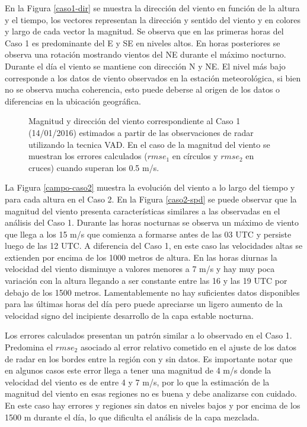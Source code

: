 \documentclass[12pt,spanish,oneside, a4paper]{book}
\begin{document}
En la Figura \ref{caso1-dir} se muestra la dirección del viento en
función de la altura y el tiempo, los vectores representan la dirección
y sentido del viento y en colores y largo de cada vector la magnitud. Se
observa que en las primeras horas del Caso 1 es predominante del E y SE
en niveles altos. En horas posteriores se observa una rotación mostrando
vientos del NE durante el máximo nocturno. Durante el día el viento se
mantiene con dirección N y NE. El nivel más bajo corresponde a los datos
de viento observados en la estación meteorológica, si bien no se observa
mucha coherencia, esto puede deberse al origen de los datos o
diferencias en la ubicación geográfica.

\begin{figure}
\newline{}\caption{Magnitud y dirección del viento  correspondiente al Caso 1 (14/01/2016) estimados a partir de las observaciones de radar utilizando la tecnica VAD. En el caso de la magnitud del viento se muestran los errores calculados ($rmse_1$ en círculos y $rmse_2$ en cruces) cuando superan los 0.5 m/s. \label{campo-caso1}}\label{fig:campo-caso1}
\end{figure}

La Figura \ref{campo-caso2} muestra la evolución del viento a lo largo
del tiempo y para cada altura en el Caso 2. En la Figura \ref{caso2-spd}
se puede observar que la magnitud del viento presenta características
similares a las observadas en el análisis del Caso 1. Durante las horas
nocturnas se observa un máximo de viento que llega a los 15 m/s que
comienza a formarse antes de las 03 UTC y persiste luego de las 12 UTC.
A diferencia del Caso 1, en este caso las velocidades altas se extienden
por encima de los 1000 metros de altura. En las horas diurnas la
velocidad del viento disminuye a valores menores a 7 m/s y hay muy poca
variación con la altura llegando a ser constante entre las 16 y las 19
UTC por debajo de los 1500 metros. Lamentablemente no hay suficientes
datos disponibles para las últimas horas del día pero puede apreciarse
un ligero aumento de la velocidad signo del incipiente desarrollo de la
capa estable nocturna.

Los errores calculados presentan un patrón similar a lo observado en el
Caso 1. Predomina el \(rmse_2\) asociado al error relativo cometido en
el ajuste de los datos de radar en los bordes entre la región con y sin
datos. Es importante notar que en algunos casos este error llega a tener
una magnitud de 4 m/s donde la velocidad del viento es de entre 4 y 7
m/s, por lo que la estimación de la magnitud del viento en esas regiones
no es buena y debe analizarse con cuidado. En este caso hay errores y
regiones sin datos en niveles bajos y por encima de los 1500 m durante
el día, lo que dificulta el análisis de la capa mezclada.
\end{document}
